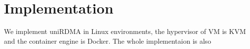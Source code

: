 \section{Implementation}
 We implement uniRDMA in Linux environments, the hypervisor of VM is KVM and the container engine is Docker. The whole implementaion is also